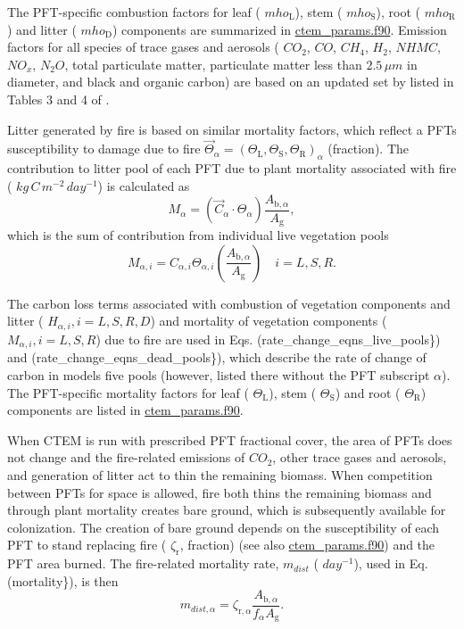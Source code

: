 The P\+F\+T-\/specific combustion factors for leaf ( $mho_\mathrm{L}$), stem ( $mho_{\mathrm{S}}$), root ( $mho_{\mathrm{R}}$) and litter ( $mho_{\mathrm{D}}$) components are summarized in \hyperlink{ctem__params_8f90}{ctem\+\_\+params.\+f90}. Emission factors for all species of trace gases and aerosols ( $CO_2$, $CO$, $CH_4$, $H_2$, $NHMC$, $NO_x$, $N_2O$, total particulate matter, particulate matter less than $2.5\,\mu m$ in diameter, and black and organic carbon) are based on an updated set by \cite{Andreae2001-e04} listed in Tables 3 and 4 of \cite{Li20121c2}.

Litter generated by fire is based on similar mortality factors, which reflect a P\+F\+T\textquotesingle{}s susceptibility to damage due to fire $\vec{\Theta}_{\alpha} = (\Theta_\mathrm{L}, \Theta_\mathrm{S}, \Theta_\mathrm{R})_\alpha$ (fraction). The contribution to litter pool of each P\+F\+T due to plant mortality associated with fire ( $kg\,C\,m^{-2}\,day^{-1}$) is calculated as \[ \label{eqn_using_mort_factors} {M_{\alpha}}= (\vec{C}_\alpha \cdot \Theta_{\alpha} ) \frac{A_{\mathrm{b},\alpha}}{A_\mathrm{g}}, \] which is the sum of contribution from individual live vegetation pools \[ \label{eqn_using_mort_factors_individual} M_{\alpha, i}= C_{\alpha, i} \Theta_{\alpha, i} \left(\frac{A_{\mathrm{b},\alpha}}{A_\mathrm{g}} \right)\quad i={L, S, R}. \]

The carbon loss terms associated with combustion of vegetation components and litter ( $H_{\alpha, i}, i={L, S, R, D}$) and mortality of vegetation components ( $M_{\alpha, i}, i={L, S, R}$) due to fire are used in Eqs. (rate\+\_\+change\+\_\+eqns\+\_\+live\+\_\+pools\}) and (rate\+\_\+change\+\_\+eqns\+\_\+dead\+\_\+pools\}), which describe the rate of change of carbon in model\textquotesingle{}s five pools (however, listed there without the P\+F\+T subscript $\alpha$). The P\+F\+T-\/specific mortality factors for leaf ( $\Theta_\mathrm{L}$), stem ( $\Theta_{\mathrm{S}}$) and root ( $\Theta_\mathrm{R}$) components are listed in \hyperlink{ctem__params_8f90}{ctem\+\_\+params.\+f90}.

When C\+T\+E\+M is run with prescribed P\+F\+T fractional cover, the area of P\+F\+Ts does not change and the fire-\/related emissions of $CO_2$, other trace gases and aerosols, and generation of litter act to thin the remaining biomass. When competition between P\+F\+Ts for space is allowed, fire both thins the remaining biomass and through plant mortality creates bare ground, which is subsequently available for colonization. The creation of bare ground depends on the susceptibility of each P\+F\+T to stand replacing fire ( $\zeta_\mathrm{r}$, fraction) (see also \hyperlink{ctem__params_8f90}{ctem\+\_\+params.\+f90}) and the P\+F\+T area burned. The fire-\/related mortality rate, $m_{dist}$ ( $day^{-1}$), used in Eq. (mortality\}), is then \[ \label{m_dist} m_{dist,\alpha} = \zeta_{\mathrm{r},\alpha} \frac{A_{\mathrm{b},\alpha}}{f_\alpha A_\mathrm{g}}. \]

